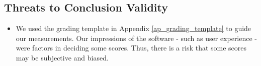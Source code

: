 \subsection{Threats to Conclusion Validity}
\begin{itemize}
\item We used the grading template in Appendix \ref{ap_grading_template} to guide our measurements. Our impressions of the software - such as user experience - were factors in deciding some scores. Thus, there is a risk that some scores may be subjective and biased.
\end{itemize}
